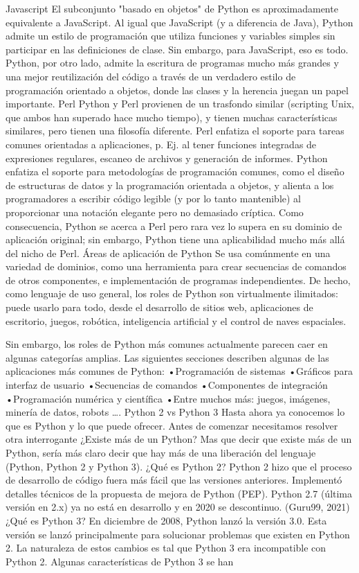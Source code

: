 Javascript
El subconjunto "basado en objetos" de Python es aproximadamente equivalente a
JavaScript. Al igual que JavaScript (y a diferencia de Java), Python admite un estilo de
programación que utiliza funciones y variables simples sin participar en las definiciones de
clase. Sin embargo, para JavaScript, eso es todo. Python, por otro lado, admite la escritura
de programas mucho más grandes y una mejor reutilización del código a través de un
verdadero estilo de programación orientado a objetos, donde las clases y la herencia juegan
un papel importante.
Perl
Python y Perl provienen de un trasfondo similar (scripting Unix, que ambos han superado
hace mucho tiempo), y tienen muchas características similares, pero tienen una filosofía
diferente. Perl enfatiza el soporte para tareas comunes orientadas a aplicaciones, p. Ej. al
tener funciones integradas de expresiones regulares, escaneo de archivos y generación de
informes. Python enfatiza el soporte para metodologías de programación comunes, como el
diseño de estructuras de datos y la programación orientada a objetos, y alienta a los
programadores a escribir código legible (y por lo tanto mantenible) al proporcionar una
notación elegante pero no demasiado críptica. Como consecuencia, Python se acerca a Perl
pero rara vez lo supera en su dominio de aplicación original; sin embargo, Python tiene una
aplicabilidad mucho más allá del nicho de Perl.
Áreas de aplicación de Python
Se usa comúnmente en una variedad de dominios, como una herramienta para crear
secuencias de comandos de otros componentes, e implementación de programas
independientes. De hecho, como lenguaje de uso general, los roles de Python son
virtualmente ilimitados: puede usarlo para todo, desde el desarrollo de sitios web,
aplicaciones de escritorio, juegos, robótica, inteligencia artificial y el control de naves
espaciales.

Sin embargo, los roles de Python más comunes actualmente parecen caer en algunas
categorías amplias. Las siguientes secciones describen algunas de las aplicaciones más
comunes de Python:
•Programación de sistemas
•Gráficos para interfaz de usuario
•Secuencias de comandos
•Componentes de integración
•Programación numérica y científica
•Entre muchos más: juegos, imágenes, minería de datos, robots ….
Python 2 vs Python 3
Hasta ahora ya conocemos lo que es Python y lo que puede ofrecer. Antes de comenzar
necesitamos resolver otra interrogante ¿Existe más de un Python? Mas que decir que existe
más de un Python, sería más claro decir que hay más de una liberación del lenguaje
(Python, Python 2 y Python 3).
¿Qué es Python 2?
Python 2 hizo que el proceso de desarrollo de código fuera más fácil que las versiones
anteriores. Implementó detalles técnicos de la propuesta de mejora de Python (PEP).
Python 2.7 (última versión en 2.x) ya no está en desarrollo y en 2020 se descontinuo.
(Guru99, 2021)
¿Qué es Python 3?
En diciembre de 2008, Python lanzó la versión 3.0. Esta versión se lanzó principalmente
para solucionar problemas que existen en Python 2. La naturaleza de estos cambios es tal
que Python 3 era incompatible con Python 2. Algunas características de Python 3 se han

